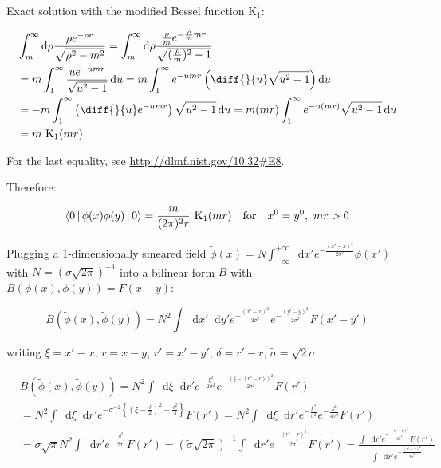 \documentclass[aspectratio=169]{beamer}
\newcommand{\di}[1]{\diff{}{#1}}
\newcommand{\diffop}{\mathop{}\!\mathrm{d}}
\newcommand{\du}{\diffop u}
\newcommand{\dxp}{\diffop x'}
\newcommand{\dyp}{\diffop y'}
\newcommand{\dxi}{\diffop \xi}
\newcommand{\drp}{\diffop r'}
\newcommand{\drho}{\diffop \rho}
\newcommand{\phixy}{\Braket{0|\phi(x)\phi(y)|0}}
\newcommand{\cintegral}{\int_m^\infty \drho \frac{\rho e^{-\rho r}}{\sqrt{\rho^2 - m^2}}}
\newcommand{\phit}{\tilde{\phi}}
\newcommand{\sigmat}{\tilde{\sigma}}
\begin{document}
\begin{frame}
Exact solution with the modified Bessel function $\mathrm{K}_1$:

\begin{equation*}
\begin{split}
&\cintegral =
\int_m^\infty \drho \frac{\frac{\rho}{m} e^{-\frac{\rho}{m} mr}}{\sqrt{(\frac{\rho}{m})^2 - 1}} \\
&= m \int_1^\infty \frac{u e^{-umr}}{\sqrt{u^2 - 1}} \du = m \int_1^\infty e^{-umr} \left( \di{u} \sqrt{u^2 - 1} \right) \du \\
&= -m \int_1^\infty \left( \di{u} e^{-umr} \right) \sqrt{u^2 - 1} \du = m(mr) \int_1^\infty e^{-u(mr)} \sqrt{u^2 - 1} \du \\
&= m \  \mathrm{K}_1(mr)
\end{split}
\end{equation*}

For the last equality, see \url{http://dlmf.nist.gov/10.32\#E8}.

Therefore:

\begin{equation*}
\phixy = \frac{m}{(2\pi)^2 r} \  \mathrm{K}_1(mr) \quad \textrm{for} \quad x^0 = y^0,\ mr > 0
\end{equation*}
\end{frame}


\begin{frame}
Plugging a 1-dimensionally smeared field $\phit(x) = N \int_{-\infty}^{+\infty} \dxp e^{-\frac{(x' - x)^2}{2 \sigma^2}} \phi(x')$
with $N = (\sigma \sqrt{2\pi})^{-1}$ into a bilinear form $B$ with $B(\phi(x), \phi(y)) = F(x - y)$:

\begin{equation*}
B(\phit(x), \phit(y)) = N^2 \int \dxp \dyp e^{-\frac{(x' - x)^2}{2 \sigma^2}} e^{-\frac{(y' - y)^2}{2 \sigma^2}} F(x' - y')
\end{equation*}

writing $\xi = x' - x$, $r = x - y$, $r' = x' - y'$, $\delta = r' - r$, $\sigmat = \sqrt{2} \sigma$:

\begin{equation*}
\begin{split}
&B(\phit(x), \phit(y)) = N^2 \int \dxi \drp e^{-\frac{\xi^2}{2 \sigma^2}} e^{-\frac{(\xi - (r' - r))^2}{2 \sigma^2}} F(r') \\
&= N^2 \int \dxi \drp e^{-\sigma^{-2} \left\{ (\xi - \frac{\delta}{2})^2 - \frac{\delta^2}{4} \right\}} F(r')
= N^2 \int \dxi \drp e^{-\frac{\xi^2}{\sigma^2}} e^{-\frac{\delta^2}{4 \sigma^2}} F(r') \\
&= \sigma \sqrt{\pi} N^2 \int \drp e^{-\frac{\delta^2}{2 \sigmat^2}} F(r')
= (\sigmat \sqrt{2\pi})^{-1} \int \drp e^{-\frac{(r' - r)^2}{2 \sigmat^2}} F(r')
= \frac{ \int \drp e^{-\frac{(r' - r)^2}{2 \sigmat^2}} F(r') }{ \int \drp e^{-\frac{(r' - r)^2}{2 \sigmat^2}} }
\end{split}
\end{equation*}
\end{frame}
\end{document}
